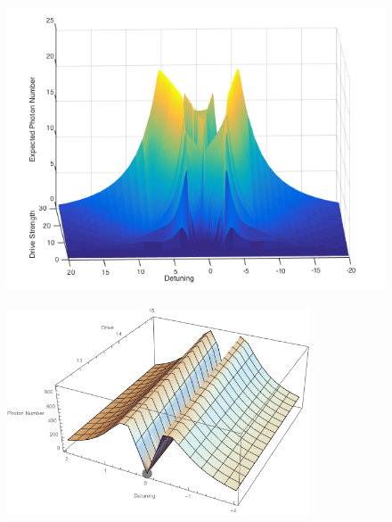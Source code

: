 \begin{figure}[h]
  \begin{minipage}{.3\linewidth}
    \centering
    \includegraphics[width=1\textwidth]{Images/HighResCarmichaelPlot.png}
    \label{fig:densp}
  \end{minipage}%
  \begin{minipage}{.3\linewidth}
    \centering
    \includegraphics[width=0.8\textwidth]{Images/MeanFieldPhotonNumber.png}
    \label{fig:meanfieldp}
  \end{minipage}%
  \begin{minipage}{.3\linewidth}
    \centering

\end{minipage}
\end{figure}
